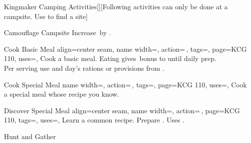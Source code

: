 \begin{PageFrontLandscape}
\begin{TablesHalf}{\frontTableHeight}
\begin{Table}{Kingmaker Camping Activities}[][Following activities can only be done at a campsite. Use
         to find a site]
\begin{entry}{Camouflage Campsite}
                Increase  \DC\,by .\hfill{}\\
                \phant{}
            \end{entry}
            \begin{entry}{Cook Basic Meal}{%
                align=center seam,
                name width=\activityLength,%
                action=\,,
                tags=\Manipulate,
                page=KCG 110,
                uses={},
            }
                Cook a basic meal. Eating gives \,\Status bonus to  until daily prep.\\
                Per serving use   and  day's rations or provisions from .\\
                 \hfill {}
            \end{entry}
            \begin{entry}{Cook Special Meal}{%
                name width=\activityLength,%
                action=\,,
                tags=\Manipulate,
                page=KCG 110,
                uses={},
            }
                Cook a special meal whose recipe you know. \hfill{}
            \end{entry}
            \begin{entry}{Discover Special Meal}{%
                align=center seam,
                name width=\activityLength,%
                action=\,,
                page=KCG 110,
                tags=\Manipulate,
                uses=,
            }
                Learn a common recipe. Prepare  . Uses . \hfill
                \\
                \hfill{} \quad {}
            \end{entry}
            \begin{entry}{Hunt and Gather}{%
}
\end{entry}
\end{Table}
\end{TablesHalf}
\end{PageFrontLandscape}
